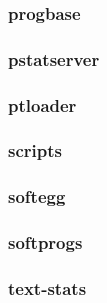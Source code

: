 \documentclass[a4paper]{article}
\begin{document}
\clearpage\subsubsection[progbase]{progbase}
\hypertarget{RefHeading23291167907073}{}\subsubsection{}
\clearpage\subsubsection[pstatserver]{pstatserver}
\hypertarget{RefHeading23311167907073}{}\subsubsection{}
\clearpage\subsubsection[ptloader]{ptloader}
\hypertarget{RefHeading23331167907073}{}\subsubsection{}
\clearpage\subsubsection[scripts]{scripts}
\hypertarget{RefHeading23351167907073}{}\subsubsection{}
\clearpage\subsubsection[softegg]{softegg}
\hypertarget{RefHeading23371167907073}{}\subsubsection{}
\clearpage\subsubsection[softprogs]{softprogs}
\hypertarget{RefHeading23391167907073}{}\subsubsection{}
\clearpage\subsubsection[text{}-stats]{text-stats}
\end{document}
